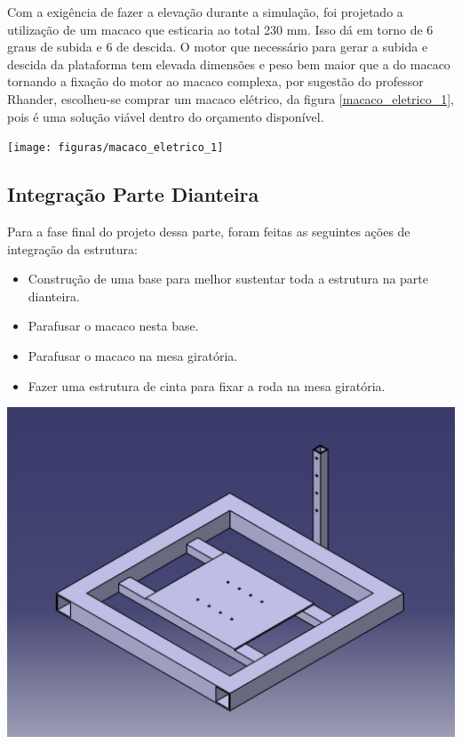   Com a exigência de fazer a elevação durante a simulação, foi projetado a utilização de um macaco que esticaria ao total 230 mm. Isso dá em torno de 6 graus de subida e 6 de descida. O motor que necessário para gerar a subida e descida da plataforma  tem elevada dimensões e peso bem maior que a do macaco tornando a fixação do motor ao macaco complexa, por sugestão do professor Rhander, escolheu-se comprar um macaco elétrico, da figura \ref{macaco_eletrico_1}, pois é uma solução viável dentro do orçamento disponível.

    \begin{center}
    	\texttt{[image: figuras/macaco\_eletrico\_1]}
        \label{macaco_eletrico_1}
    \end{center}    

\subsection{Integração Parte Dianteira}
  Para a fase final do projeto dessa parte, foram feitas as seguintes ações de integração da estrutura:
  \begin{itemize}
        \item Construção de uma base para melhor sustentar toda a estrutura na parte dianteira.
        \item Parafusar o macaco nesta base.
        \item Parafusar o macaco na mesa giratória.
        \item Fazer uma estrutura de cinta para fixar a roda na mesa giratória.
    \end{itemize}
    
    \begin{center}
    	\includegraphics[scale=0.5]{figuras/Base_dianteira}
        \label{base.dianteira}
    \end{center}  


